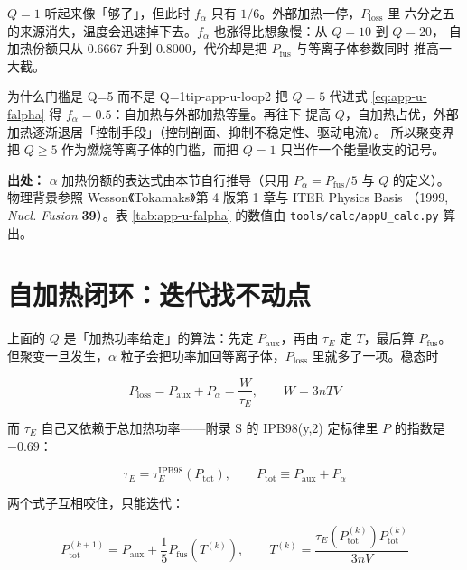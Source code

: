 $Q=1$ 听起来像「够了」，但此时 $f_\alpha$ 只有 $1/6$。外部加热一停，$P_{\mathrm{loss}}$ 里
六分之五的来源消失，温度会迅速掉下去。$f_\alpha$ 也涨得比想象慢：从 $Q=10$ 到 $Q=20$，
自加热份额只从 $0.6667$ 升到 $0.8000$，代价却是把 $P_{\mathrm{fus}}$ 与等离子体参数同时
推高一大截。

\begin{tip}{为什么门槛是 Q=5 而不是 Q=1}{tip-app-u-loop2}
把 $Q=5$ 代进式 \eqref{eq:app-u-falpha} 得 $f_\alpha=0.5$：自加热与外部加热等量。再往下
提高 $Q$，自加热占优，外部加热逐渐退居「控制手段」（控制剖面、抑制不稳定性、驱动电流）。
所以聚变界把 $Q\ge5$ 作为燃烧等离子体的门槛，而把 $Q=1$ 只当作一个能量收支的记号。
\end{tip}

{\footnotesize
\textbf{出处：} $\alpha$ 加热份额的表达式由本节自行推导（只用 $P_\alpha=P_{\mathrm{fus}}/5$
与 $Q$ 的定义）。
物理背景参照 Wesson《Tokamaks》第 4 版第 1 章与 ITER Physics Basis
（1999, \textit{Nucl. Fusion} \textbf{39}）。表 \ref{tab:app-u-falpha} 的数值由
\texttt{tools/\allowbreak{}calc/\allowbreak{}appU\_calc.py} 算出。
}

\section{自加热闭环：迭代找不动点}
\label{sec:app-u-loop}

上面的 $Q$ 是「加热功率给定」的算法：先定 $P_{\mathrm{aux}}$，再由 $\tau_E$ 定 $T$，最后算
$P_{\mathrm{fus}}$。但聚变一旦发生，$\alpha$ 粒子会把功率加回等离子体，$P_{\mathrm{loss}}$
里就多了一项。稳态时

\begin{equation}
P_{\mathrm{loss}} = P_{\mathrm{aux}} + P_\alpha = \frac{W}{\tau_E},
\qquad W = 3nTV
\label{eq:app-u-balance}
\end{equation}

而 $\tau_E$ 自己又依赖于总加热功率——附录 S 的 IPB98(y,2) 定标律里 $P$ 的指数是 $-0.69$：

\begin{equation}
\tau_E = \tau_E^{\mathrm{IPB98}}\!\left(P_{\mathrm{tot}}\right),
\qquad P_{\mathrm{tot}} \equiv P_{\mathrm{aux}} + P_\alpha
\label{eq:app-u-ipb}
\end{equation}

两个式子互相咬住，只能迭代：

\begin{equation}
P_{\mathrm{tot}}^{(k+1)} = P_{\mathrm{aux}}
+ \frac{1}{5}P_{\mathrm{fus}}\!\left(T^{(k)}\right),
\qquad
T^{(k)} = \frac{\tau_E\!\left(P_{\mathrm{tot}}^{(k)}\right)P_{\mathrm{tot}}^{(k)}}{3nV}
\label{eq:app-u-loop}
\end{equation}

